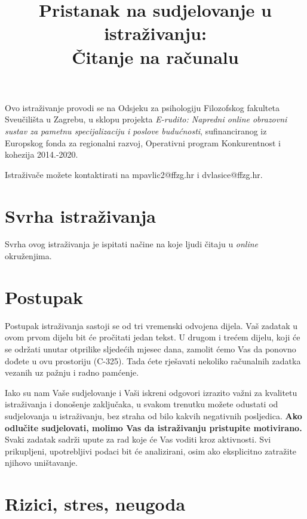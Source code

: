 \documentclass[11pt]{article}
\title{\bfseries \large Pristanak na sudjelovanje u istraživanju:\\
        \Large Čitanje na računalu}
\date{}
\author{}
\begin{document}
\vspace{-4em}

\maketitle

\vspace*{-4em}

\noindent Ovo istraživanje provodi se na Odsjeku za psihologiju Filozofskog 
fakulteta Sveučilišta u Zagrebu, u sklopu projekta \textit{E-rudito: Napredni 
online obrazovni sustav za pametnu specijalizaciju i poslove budućnosti}, 
sufinanciranog iz Europskog fonda za regionalni razvoj, Operativni program 
Konkurentnost i kohezija 2014.-2020.

\vspace{6pt}

\noindent Istraživače možete kontaktirati na mpavlic2@ffzg.hr i dvlasice@ffzg.hr.

\section{Svrha istraživanja}

Svrha ovog istraživanja je ispitati načine na koje ljudi čitaju u \textit{online}
okruženjima.

\section{Postupak}

Postupak istraživanja sastoji se od tri vremenski odvojena dijela.
Vaš zadatak u ovom prvom dijelu bit će pročitati jedan tekst.
U drugom i trećem dijelu, koji će se održati unutar otprilike sljedećih mjesec dana, 
zamolit ćemo  Vas da ponovno dođete u ovu prostoriju (C-325). Tada ćete rješavati 
nekoliko računalnih zadatka vezanih uz pažnju i radno pamćenje.


Iako su nam Vaše sudjelovanje i Vaši iskreni odgovori izrazito važni za
kvalitetu istraživanja i donošenje zaključaka, u svakom trenutku možete odustati
od sudjelovanja u istraživanju, bez straha od bilo kakvih negativnih posljedica. 
\textbf{Ako odlučite sudjelovati, molimo Vas da istraživanju pristupite motivirano.}
Svaki zadatak sadrži upute za rad koje će Vas voditi kroz aktivnosti.
Svi prikupljeni, upotrebljivi podaci bit će analizirani, osim ako eksplicitno
zatražite njihovo uništavanje.

\section{Rizici, stres, neugoda}
\end{document}
